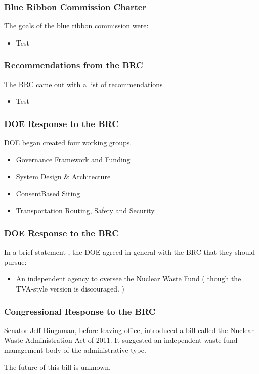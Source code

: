 
\begin{frame}[ctb!]
    \frametitle{Blue Ribbon Commission Charter}
    The goals of the blue ribbon commission were:
    \begin{itemize}
      \item Test
    \end{itemize}
  \end{frame}

\begin{frame}[ctb!]
    \frametitle{Recommendations from the BRC}
    The BRC came out with a list of recommendations
    \begin{itemize}
      \item Test
    \end{itemize}
  \end{frame}

\begin{frame}[ctb!]
    \frametitle{DOE Response to the BRC}

    DOE began created four working groups. 
    \begin{itemize}
      \item Governance Framework and Funding
      \item System Design \& Architecture
      \item ConsentBased Siting
      \item Transportation Routing, Safety and Security
    \end{itemize}
  \end{frame}

\begin{frame}[ctb!]
    \frametitle{DOE Response to the BRC}

    In a brief statement \cite{doe_strategy_2013}, the DOE agreed in general 
    with the BRC that they should pursue:

    \begin{itemize}
      \item An independent agency to oversee the Nuclear Waste 
        Fund ( though the TVA-style version is discouraged. )
    \end{itemize}
  \end{frame}

\begin{frame}[ctb!]
    \frametitle{Congressional Response to the BRC}
    Senator Jeff Bingaman, before leaving office, introduced a bill called the 
    Nuclear Waste Administration Act of 2011. It suggested an independent waste 
    fund management body of the administrative type. 

    The future of this bill is unknown. 
  \end{frame}

